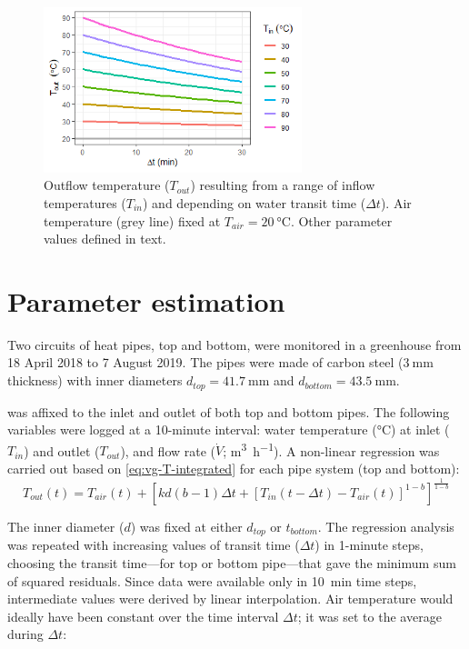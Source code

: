 \begin{figure} [ht]
\centering
\includegraphics[width=0.67\textwidth]{graphics/vg/heat-pipe-Tout.png}
\caption{Outflow temperature ($T_{out}$) resulting from a range of inflow temperatures ($T_{in}$) and depending on water transit time ($\Delta t$). Air temperature (grey line) fixed at $T_{air}=\SI{20}{\celsius}$. Other parameter values defined in text.}
\label{fig:vg-heat-pipe-Tout}
\end{figure}

\section{Parameter estimation}

Two circuits of heat pipes, top and bottom, were monitored in a greenhouse from 18 April 2018 to 7 August 2019. The pipes were made of carbon steel ($\SI{3}{\milli\meter}$ thickness) with inner diameters $d_{top}=\SI{41.7}{\milli\meter}$ and $d_{bottom}=\SI{43.5}{\milli\meter}$. 

 was affixed to the inlet and outlet of both top and bottom pipes. The following variables were logged at a 10-minute interval: water temperature (\si{\celsius}) at inlet ($T_{in}$) and outlet ($T_{out}$), and flow rate ($\dot{V}$; \si{\cubic\meter\per\hour}). A non-linear regression was carried out based on \cref{eq:vg-T-integrated} for each pipe system (top and bottom):
\begin{equation}
  T_{out}(t) = T_{air}(t) + \left[ kd(b-1)\Delta t + \left[ T_{in}(t-\Delta t)-T_{air}(t)\right]^{1-b}  \right]^\frac{1}{1-b} 
  \label{eq:vg-regression}
\end{equation}

The inner diameter ($d$) was fixed at either $d_{top}$ or $t_{bottom}$. The regression analysis was repeated with increasing values of transit time ($\Delta t$) in 1-minute steps, choosing the transit time---for top or bottom pipe---that gave the minimum sum of squared residuals. Since data were available only in \SI{10}{\minute} time steps, intermediate values were derived by linear interpolation. Air temperature would ideally have been constant over the time interval $\Delta t$; it was set to the average during $\Delta t$: 

